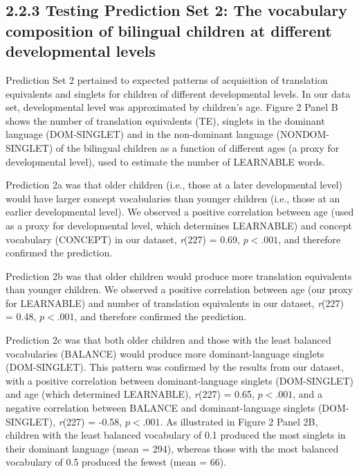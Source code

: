 \documentclass[
  english,
  ,man,floatsintext]{apa6}
\begin{document}
\hypertarget{testing-prediction-set-2-the-vocabulary-composition-of-bilingual-children-at-different-developmental-levels}{%
\subsection{2.2.3 Testing Prediction Set 2: The vocabulary composition of bilingual children at different developmental levels}\label{testing-prediction-set-2-the-vocabulary-composition-of-bilingual-children-at-different-developmental-levels}}

Prediction Set 2 pertained to expected patterns of acquisition of translation equivalents and singlets for children of different developmental levels. In our data set, developmental level was approximated by children's age. Figure 2 Panel B shows the number of translation equivalents (TE), singlets in the dominant language (DOM-SINGLET) and in the non-dominant language (NONDOM-SINGLET) of the bilingual children as a function of different ages (a proxy for developmental level), used to estimate the number of LEARNABLE words.

Prediction 2a was that older children (i.e., those at a later developmental level) would have larger concept vocabularies than younger children (i.e., those at an earlier developmental level). We observed a positive correlation between age (used as a proxy for developmental level, which determines LEARNABLE) and concept vocabulary (CONCEPT) in our dataset, \emph{r}(227) = 0.69, \(p < .001\), and therefore confirmed the prediction.

Prediction 2b was that older children would produce more translation equivalents than younger children. We observed a positive correlation between age (our proxy for LEARNABLE) and number of translation equivalents in our dataset, \emph{r}(227) = 0.48, \(p < .001\), and therefore confirmed the prediction.

Prediction 2c was that both older children and those with the least balanced vocabularies (BALANCE) would produce more dominant-language singlets (DOM-SINGLET). This pattern was confirmed by the results from our dataset, with a positive correlation between dominant-language singlets (DOM-SINGLET) and age (which determined LEARNABLE), \emph{r}(227) = 0.65, \(p < .001\), and a negative correlation between BALANCE and dominant-language singlets (DOM-SINGLET), \emph{r}(227) = -0.58, \(p < .001\). As illustrated in Figure 2 Panel 2B, children with the least balanced vocabulary of 0.1 produced the most singlets in their dominant language (mean = 294), whereas those with the most balanced vocabulary of 0.5 produced the fewest (mean = 66).
\end{document}
